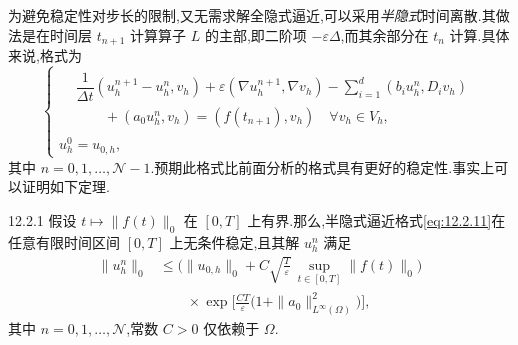 为避免稳定性对步长的限制,又无需求解全隐式逼近,可以采用\emph{半隐式}时间离散.其做法是在时间层 \(t_{n+1}\) 计算算子 \(L\) 的主部,即二阶项 \(-\varepsilon\Delta\),而其余部分在 \(t_n\) 计算.具体来说,格式为
\begin{equation}\label{eq:12.2.11}
  \begin{cases}
    \begin{aligned}
      &\dfrac{1}{\Delta t}(u_h^{n+1}-u_h^n,v_h)
        +\varepsilon(\nabla u_h^{n+1},\nabla v_h)
        -\displaystyle\sum_{i=1}^d(b_iu_h^n,D_iv_h)\\
      &\qquad+(a_0u_h^n,v_h)=(f(t_{n+1}),v_h)
        \quad\forall v_h\in V_h,
    \end{aligned}\\[2pt]
    u_h^0=u_{0,h},
  \end{cases}
\end{equation}
其中 \(n=0,1,\ldots,\mathcal N-1\).预期此格式比前面分析的格式具有更好的稳定性.事实上可以证明如下定理.

\begin{theorem}[]{12.2.1}
假设 \(t\mapsto\|f(t)\|_0\) 在 \([0,T]\) 上有界.那么,半隐式逼近格式\eqref{eq:12.2.11}在任意有限时间区间 \([0,T]\) 上无条件稳定,且其解 \(u_h^n\) 满足
\begin{equation}\label{eq:12.2.12}
  \begin{aligned}
    \|u_h^n\|_0
      &\le\biggl(\|u_{0,h}\|_0+C\sqrt{\frac{T}{\varepsilon}}\,
            \sup_{t\in[0,T]}\|f(t)\|_0\biggr)\\
      &\qquad\times\exp\biggl[\frac{CT}{\varepsilon}
           \bigl(1+\|a_0\|_{L^\infty(\Omega)}^2\bigr)\biggr],
  \end{aligned}
\end{equation}
其中 \(n=0,1,\ldots,\mathcal N\),常数 \(C>0\) 仅依赖于 \(\Omega\).
\end{theorem}

